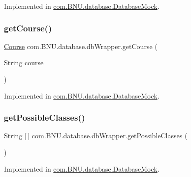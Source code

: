 Implemented in \mbox{\hyperlink{classcom_1_1_b_n_u_1_1database_1_1_database_mock_ad8446bcb76d60c216cae020b0c33ee21}{com.\+B\+N\+U.\+database.\+Database\+Mock}}.

\mbox{\label{interfacecom_1_1_b_n_u_1_1database_1_1db_wrapper_a1dda3f09c5d0381e824cf71276e67447}} 
\subsubsection{\texorpdfstring{get\+Course()}{getCourse()}}
{\footnotesize\ttfamily \mbox{\hyperlink{classcom_1_1_b_n_u_1_1pages_1_1classes_by_teacher_1_1_course}{Course}} com.\+B\+N\+U.\+database.\+db\+Wrapper.\+get\+Course (\begin{DoxyParamCaption}\item[{String}]{course }\end{DoxyParamCaption})}



Implemented in \mbox{\hyperlink{classcom_1_1_b_n_u_1_1database_1_1_database_mock_a0c35cbc9bbb46241d65bbffa50d49b83}{com.\+B\+N\+U.\+database.\+Database\+Mock}}.

\mbox{\label{interfacecom_1_1_b_n_u_1_1database_1_1db_wrapper_a1ed594ea1c8144cbcdab0e5a6a446722}} 
\subsubsection{\texorpdfstring{get\+Possible\+Classes()}{getPossibleClasses()}}
{\footnotesize\ttfamily String \mbox{[}$\,$\mbox{]} com.\+B\+N\+U.\+database.\+db\+Wrapper.\+get\+Possible\+Classes (\begin{DoxyParamCaption}{ }\end{DoxyParamCaption})}



Implemented in \mbox{\hyperlink{classcom_1_1_b_n_u_1_1database_1_1_database_mock_a6c43f4a70a1c4c2060b58855ae45257a}{com.\+B\+N\+U.\+database.\+Database\+Mock}}.

